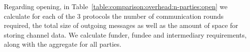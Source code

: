   Regarding opening, in
  Table~\ref{table:comparison:overhead:n-parties:open} we calculate for each of
  the $3$ protocols the number of communication rounds required, the total
  size of outgoing messages as well as the amount of space for storing
  channel data. We calculate funder, fundee
  and intermediary requirements, along with the aggregate for all parties.
%
%
%
